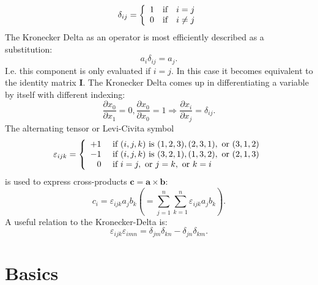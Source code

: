 \documentclass[m,times]{cgMA}
\begin{document}
\begin{equation}
  \delta _ { i j } = \left\{
    \begin{array} { l l l }
      { 1 } & {\text{if}} &  {i = j}  \\
      { 0 } & {\text{if}} &  { i \neq j }
  \end{array} \right.
\end{equation}
The Kronecker Delta as an operator is most efficiently described as a substitution:
\begin{equation}
  a _ { i } \delta _ { i j } = a _ { j }.
\end{equation}
I.e. this component is only evaluated if $i = j$. In this case it becomes equivalent to the identity matrix $\boldsymbol{I}$. The Kronecker Delta comes up in differentiating a variable by itself with different indexing:
\begin{equation}
  \frac{\partial{x_0}}{\partial{x_1}}=0, \frac{\partial{x_0}}{\partial{x_0}}=1  \Rightarrow \frac{\partial{x_i}}{\partial{x_j}} = \delta_{ij}.
\end{equation}
The alternating tensor or Levi-Civita symbol
\begin{equation}
  \varepsilon _ { i j k } = \left\{ \begin{array} { r l } { + 1 } & { \text { if } ( i , j , k ) \text { is } ( 1,2,3 ) , ( 2,3,1 ) , \text { or } ( 3,1,2 ) } \\ { - 1 } & { \text { if } ( i , j , k ) \text { is } ( 3,2,1 ) , ( 1,3,2 ) , \text { or } ( 2,1,3 ) } \\ { 0 } & { \text { if } i = j , \text { or } j = k , \text { or } k = i } \end{array} \right.
\end{equation}
is used to express cross-products $\boldsymbol{c}=\boldsymbol{a} \times \boldsymbol{b}$:
\begin{equation}
  c_i = \varepsilon_{ijk} a_j b_k \left(= \sum _ { j = 1 } ^ { n } \sum _ { k = 1 } ^ { n } \varepsilon_{ijk} a_j b_k\right).
\end{equation}
A useful relation to the Kronecker-Delta is:
\begin{equation} \label{eq:compact_levi}
  \varepsilon _ { i j k } \varepsilon _ { i m n } = \delta _ { j m } \delta _ { k n } - \delta _ { j n } \delta _ { k m }.
\end{equation}
\cite{MCGINTY:CONTINUUM}
\clearpage
\section{Basics}\label{sec:basics}
\end{document}
